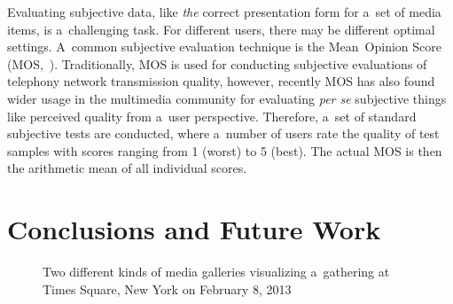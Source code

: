 \documentclass{sig-alternate}
\begin{document}
Evaluating subjective data, like \emph{the} correct presentation form
for a~set of media items, is a~challenging task.
For different users, there may be different optimal settings.
A~common subjective evaluation technique
is the Mean~Opinion Score (MOS,~\cite{itu1998mos}).
Traditionally, MOS is used for conducting subjective evaluations
of telephony network transmission quality,
however, recently MOS has also found
wider usage in the multimedia community
for evaluating \emph{per se} subjective things
like perceived quality from a~user perspective. 
Therefore, a~set of standard subjective tests are conducted,
where a~number of users rate the quality of test samples
with scores ranging from 1 (worst) to 5 (best).
The actual MOS is then the arithmetic mean of all individual scores.

\section{Conclusions and Future Work}

\begin{figure}[t!]
  \centering
  \caption{Two different kinds of media galleries visualizing a~gathering at Times Square, New York on February 8, 2013}
  \label{fig:media-gallery}  
\end{figure}





\end{document}
